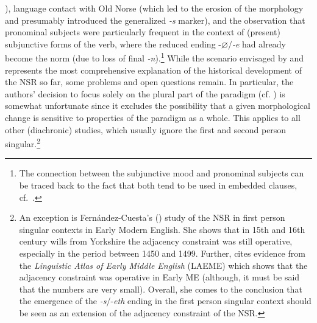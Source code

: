 \documentclass[output=paper]{langsci/langscibook}
\begin{document}
\citealt{Benskin2011}), language contact with Old Norse (which led to the
erosion of the  morphology and presumably introduced the generalized
\emph{-s} marker), and the observation that pronominal subjects were
particularly frequent in the context of (present) subjunctive forms of the
verb, where the reduced ending -$\varnothing$/\emph{-e} had already become the norm (due
to loss of final \emph{-n}).\footnote{The connection between the subjunctive
    mood and pronominal subjects can be traced back to the fact that both tend
to be used in embedded clauses, cf.\ \citet{deHaas:2011}.} While the
scenario envisaged by \textcite{deHaas:2011} and
\textcite{deHaasandvanKemenade:2015} represents the most comprehensive
explanation of the historical development of the \gls{NSR} so far, some
problems and open questions remain. In particular, the authors' decision to
focus solely on the plural part of the paradigm (cf.
\citealt[60]{deHaas:2011}) is somewhat unfortunate since it excludes the
possibility that a given morphological change is sensitive to properties of
the paradigm as a whole.  This applies to all other (diachronic) studies,
which usually ignore the first and second person singular.\footnote{An
    exception is Fernández-Cuesta's (\citeyear{Fernandez-Cuesta:2011})
    study of the \gls{NSR} in first person singular contexts in Early
    Modern English. She shows that in 15th and 16th century wills
    from Yorkshire the adjacency constraint was still operative, especially
    in the period between 1450 and 1499. Further,
    \citeauthor{Fernandez-Cuesta:2011} cites evidence from the
    \emph{Linguistic Atlas of Early Middle English} (LAEME) which shows
    that the adjacency constraint was operative in Early \gls{ME} (although, it
    must be said that the numbers are very small). Overall, she comes to
    the conclusion that the emergence of the \emph{-s}/-\emph{eth} ending
    in the first person singular context should be seen as an extension of
the adjacency constraint of the \gls{NSR}.}
\end{document}

